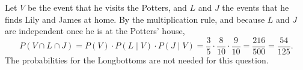 Let $V$ be the event that he visits the Potters, and $L$ and $J$ the events that he finds Lily and James at home. By the multiplication rule, and because $L$ and $J$ are independent once he is at the Potters' house,
\[P(V\cap L\cap J)=P(V)\cdot P(L\mid V)\cdot P(J\mid V)=\dfrac35\cdot\dfrac{8}{10}\cdot\dfrac{9}{10}=\dfrac{216}{500}=\boxed{\dfrac{54}{125}}.\]
The probabilities for the Longbottoms are not needed for this question.
